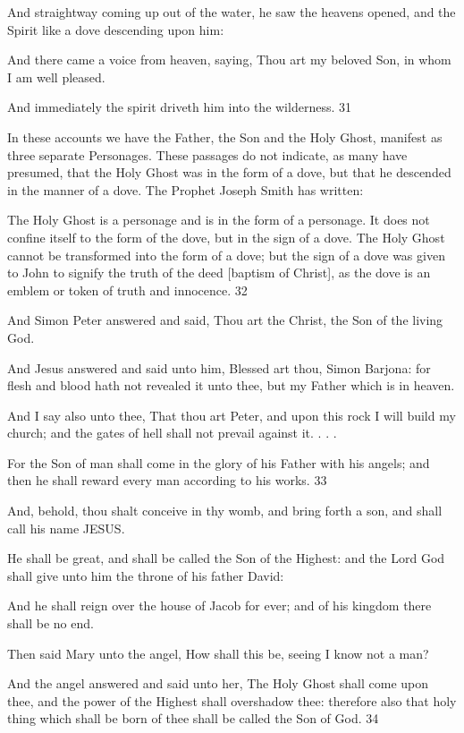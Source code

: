 And straightway coming up out of the water, he saw the heavens opened, and the Spirit like a
dove descending upon him:

And there came a voice from heaven, saying, Thou art my beloved Son, in whom I am well
pleased.

And immediately the spirit driveth him into the wilderness. 31

In these accounts we have the Father, the Son and the Holy Ghost, manifest as three separate
Personages. These passages do not indicate, as many have presumed, that the Holy Ghost
was in the form of a dove, but that he descended in the manner of a dove. The Prophet Joseph
Smith has written:

The Holy Ghost is a personage and is in the form of a personage. It does not confine itself to
the form of the dove, but in the sign of a dove. The Holy Ghost cannot be transformed into
the form of a dove; but the sign of a dove was given to John to signify the truth of the deed
[baptism of Christ], as the dove is an emblem or token of truth and innocence. 32

And Simon Peter answered and said, Thou art the Christ, the Son of the living God.

And Jesus answered and said unto him, Blessed art thou, Simon Barjona: for flesh and blood
hath not revealed it unto thee, but my Father which is in heaven.

And I say also unto thee, That thou art Peter, and upon this rock I will build my church; and
the gates of hell shall not prevail against it. . . .

For the Son of man shall come in the glory of his Father with his angels; and then he shall
reward every man according to his works. 33

And, behold, thou shalt conceive in thy womb, and bring forth a son, and shall call his name
JESUS.

He shall be great, and shall be called the Son of the Highest: and the Lord God shall give
unto him the throne of his father David:

And he shall reign over the house of Jacob for ever; and of his kingdom there shall be no end.

Then said Mary unto the angel, How shall this be, seeing I know not a man?

And the angel answered and said unto her, The Holy Ghost shall come upon thee, and the
power of the Highest shall overshadow thee: therefore also that holy thing which shall be
born of thee shall be called the Son of God. 34

